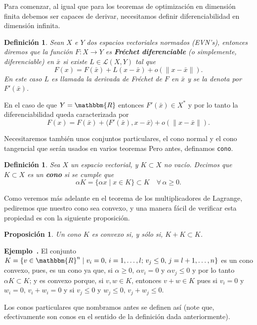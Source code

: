 \documentclass[a4paper,10pt]{book}
\newcommand{\R}{\mathbbm{R}}
\newcommand{\Rn}{\R^n}
\newcommand{\arr}{\rightarrow}
\newcommand{\bx}{\bar{x}}
\newcommand{\la}{\langle}
\newcommand{\ra}{\rangle}
\newtheorem{prop}[teo]{Proposici\'on}
\newtheorem{defi}[teo]{Definici\'on}
\newcounter{ejem}[section]
\newenvironment{ejem}[1][]{\refstepcounter{ejem}\par\medskip
   \noindent \textbf{Ejemplo~\theejem. #1} \rmfamily}{\medskip}
\begin{document}
Para comenzar, al igual que para los teoremas de optimización en dimensión finita debemos ser capaces de derivar, necesitamos definir diferenciabilidad en dimensión infinita.
\begin{defi} Sean $X$ e $Y$ dos espacios vectoriales normados (EVN's), entonces diremos que la función $F:X\arr Y$ es \textbf{Fréchet diferenciable} (o simplemente, diferenciable) en $\bx$ si existe $L\in\mathcal{L}(X,Y)$ tal que
$$F(x)=F(\bx)+L(x-\bx)+o(\| x-\bx\|).$$
En este caso $L$ es llamada la derivada de Fréchet de $F$ en $\bx$ y se la denota por $F'(\bx)$.
\end{defi} 
En el caso de que $Y=\R$ entonces $F'(\bx)\in X^*$ y por lo tanto la diferenciabilidad queda caracterizada por
$$F(x)=F(\bx)+\la F'(\bx),x-\bx\ra+o(\|x-\bx\|).$$


 Necesitaremos también unos conjuntos particulares,  el cono normal y el cono tangencial que serán usados en varios teoremas Pero antes, definamos \texttt{cono}.

\begin{defi}
Sea $X$ un espacio vectorial, y $K\subset X$ no vacío. Decimos que $K\subset X$ es un \textbf{cono} si se cumple que $$\alpha K=\{\alpha x\mid x\in K\}\subset K\quad\forall\,\alpha\geq 0.$$ 
\end{defi} 

Como veremos más adelante en el teorema de los multiplicadores de Lagrange, pediremos que nuestro cono sea convexo, y una manera fácil de verificar esta propiedad es con la siguiente proposición.

\begin{prop}
 Un cono $K$ es convexo si, y sólo si, $K+K\subset K$.
\end{prop}

\begin{ejem}
El conjunto $K=\{v\in\Rn \mid v_i=0,\,i=1,\ldots,l;\,v_j\leq0,\, j=l+1,\ldots,n\}$ es un cono convexo, pues, es un cono ya que, si $\alpha\geq0,\,\alpha v_i=0$ y $\alpha v_j\leq0$ y por lo tanto $\alpha K\subset K$; y es convexo porque, si $v,w\in K$, entonces $v+w\in K$ pues si $v_i=0$ y $w_i=0,\,v_i+w_i=0$ y si $v_j\leq0$ y $w_j\leq0,\, v_j+w_j\leq0$.
 
\end{ejem}


Los conos particulares que nombramos antes se definen así (note que, efectivamente son conos en el sentido de la definición dada anteriormente).
\end{document}
